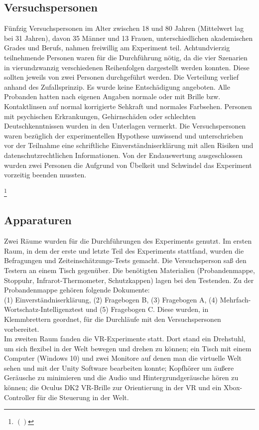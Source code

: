 \documentclass{Paper}
\begin{document}
	\subsection{Versuchspersonen}
		Fünfzig Versuchspersonen im Alter zwischen 18 und 80 Jahren (Mittelwert lag bei 31 Jahren),
		davon 35 Männer und 13 Frauen, unterschiedlichen akademischen Grades und Berufs, nahmen
		freiwillig am Experiment teil. Achtundvierzig teilnehmende Personen waren für die
		Durchführung nötig, da die vier Szenarien in vierundzwanzig verschiedenen Reihenfolgen
		dargestellt werden konnten. Diese sollten jeweils von zwei Personen durchgeführt werden. Die
		Verteilung verlief anhand des Zufallsprinzip. Es wurde keine Entschädigung angeboten. Alle
		Probanden hatten nach eigenen Angaben normale oder mit Brille bzw. Kontaktlinsen auf
		normal korrigierte Sehkraft und normales Farbsehen. Personen mit
		psychischen Erkrankungen, Gehirnschäden oder schlechten Deutschkenntnissen wurden in den Unterlagen vermerkt. Die Versuchspersonen waren bezüglich der experimentellen Hypothese unwissend
		und unterschrieben vor der Teilnahme eine schriftliche Einverständniserklärung mit allen
		Risiken und datenschutzrechtlichen Informationen.
		Von der Endauswertung ausgeschlossen wurden zwei Personen die Aufgrund von Übelkeit und
		Schwindel das Experiment vorzeitig beenden mussten.
		\par
		
		\footnote{$()$}
		
	\subsection{Apparaturen}
		Zwei Räume wurden für die Durchführungen des Experiments genutzt. Im ersten Raum, in dem der erste und letzte Teil des Experiments stattfand, wurden die Befragungen und Zeiteinschätzungs-Tests gemacht. 
	Die Versuchsperson saß den Testern an einem Tisch gegenüber. Die benötigten Materialien (Probandenmappe, Stoppuhr, Infrarot-Thermometer, Schutzkappen) lagen bei den Testenden. Zu der Probandenmappe gehören folgende Dokumente:\\		
	 (1) Einverständniserklärung, (2) \glqq Fragebogen B\grqq, (3) \glqq Fragebogen A\grqq, (4)
		Mehrfach-Wortschatz-Intelligenztest und (5) \glqq Fragebogen C\grqq.
		Diese wurden, in Klemmbrettern geordnet, für die Durchläufe mit den Versuchspersonen
		vorbereitet. \\
		Im zweiten Raum fanden die VR-Experimente statt. Dort stand ein Drehstuhl, um sich flexibel in der
		Welt bewegen und drehen zu können; ein Tisch mit einem Computer (Windows 10) und zwei Monitore auf denen man
		die virtuelle Welt sehen und mit der Unity Software bearbeiten konnte; Kopfhörer um äußere
		Geräusche zu minimieren und die Audio und Hintergrundgeräusche hören zu können; die Oculus DK2 VR-Brille
		zur Orientierung in der VR und ein Xbox-Controller für die Steuerung in der Welt.
\end{document}
